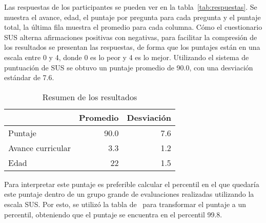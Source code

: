 Las respuestas de los participantes se pueden ver en la tabla~\ref{tab:respuestas}. Se muestra el avance, edad, el puntaje por pregunta para cada pregunta y el puntaje total, la última fila muestra el promedio para cada columna.
Cómo el cuestionario SUS alterna afirmaciones positivas con negativas, para facilitar la compresión de los resultados se presentan las respuestas, de forma que los puntajes están en una escala entre 0 y 4, donde 0 es lo peor y 4 es lo mejor. Utilizando el sistema de puntuación de SUS se obtuvo un puntaje promedio de 90.0, con una desviación estándar de 7.6.

\begin{table}[hbt]
    \centering
    \caption{Resumen de los resultados}
    \label{tab:resumen-resultados}
    \begin{tabular}{@{}lrr@{}}
    \toprule
                      & \textbf{Promedio} & \textbf{Desviación} \\ \midrule
    Puntaje           & 90.0              & 7.6        \\
    Avance curricular & 3.3               & 1.2        \\
    Edad              & 22                & 1.5        \\ \bottomrule
    \end{tabular}
\end{table}

Para interpretar este puntaje es preferible calcular el percentil en el que quedaría este puntaje dentro de un grupo grande de evaluaciones realizadas utilizando la escala SUS. Por esto, se utilizó la tabla de~\cite{quantifying-the-user-experience} para transformar el puntaje a un percentil, obteniendo que el puntaje se encuentra en el percentil 99.8.

